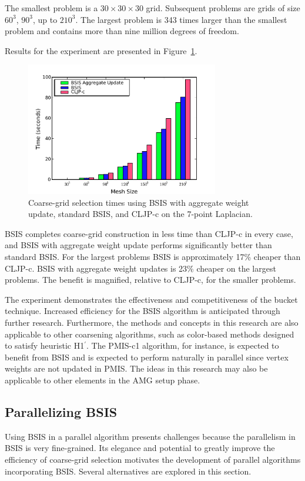 \documentclass{elsart}
\begin{document}
The smallest problem is a $30 \times 30 \times 30$ grid. Subsequent
problems are grids of size $60^3$, $90^3$, up to $210^3$. The largest
problem is 343 times larger than the smallest problem and contains
more than nine million degrees of freedom.

Results for the experiment are presented in
Figure~\ref{5:fig:results-full}.
\begin{figure}
  \begin{center}
    \includegraphics[width=0.75\textwidth]{images/agg-no-scaling}
    \caption{Coarse-grid selection times using BSIS with aggregate
    weight update, standard BSIS, and CLJP-c on the 7-point
    Laplacian.}
    \label{5:fig:results-full}
  \end{center}
\end{figure}
BSIS completes coarse-grid construction in less time than CLJP-c in
every case, and BSIS with aggregate weight update performs
significantly better than standard BSIS. For the largest problems BSIS
is approximately 17\% cheaper than CLJP-c. BSIS with aggregate weight
updates is 23\% cheaper on the largest problems. The benefit is
magnified, relative to CLJP-c, for the smaller problems.

The experiment demonstrates the effectiveness and competitiveness of
the bucket technique. Increased efficiency for the BSIS algorithm is
anticipated through further research. Furthermore, the methods and
concepts in this research are also applicable to other coarsening
algorithms, such as color-based methods designed to satisfy heuristic
H1$^\prime$. The PMIS-c1 algorithm, for instance, is expected to
benefit from BSIS and is expected to perform naturally in parallel
since vertex weights are not updated in PMIS. The ideas in this
research may also be applicable to other elements in the AMG setup
phase.

\subsection{Parallelizing BSIS}
Using BSIS in a parallel algorithm presents challenges because the
parallelism in BSIS is very fine-grained. Its elegance and potential
to greatly improve the efficiency of coarse-grid selection motivates
the development of parallel algorithms incorporating BSIS. Several
alternatives are explored in this section.
\end{document}
